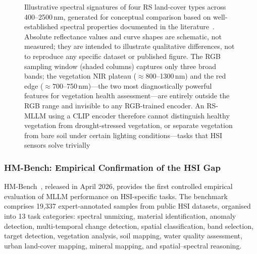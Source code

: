 \begin{figure}[h]
\caption{Illustrative spectral signatures of four RS land-cover types across
400--2500\,nm, generated for conceptual comparison based on
well-established spectral properties documented in the
literature~\cite{bioucas2013hyperspectral,yokoya2018hyperspectral,chen2014spectral}.
Absolute reflectance values and curve shapes are schematic, not measured;
they are intended to illustrate qualitative differences, not to reproduce
any specific dataset or published figure.
The RGB sampling window (shaded columns) captures only three broad bands;
the vegetation NIR plateau ($\approx\!800$--1300\,nm) and the red edge
($\approx\!700$--750\,nm)---the two most diagnostically powerful features for
vegetation health assessment---are entirely outside the RGB range and
invisible to any RGB-trained encoder. An RS-MLLM using a CLIP encoder
therefore cannot distinguish healthy vegetation from drought-stressed
vegetation, or separate vegetation from bare soil under certain lighting
conditions---tasks that HSI sensors solve trivially}\label{fig:hsi_sig}
\end{figure}

\subsubsection{HM-Bench: Empirical Confirmation of the HSI Gap}\label{sec5:hmbench}

HM-Bench~\cite{hmbench2026}, released in April 2026, provides the first
controlled empirical evaluation of MLLM performance on HSI-specific tasks.
The benchmark comprises 19,337 expert-annotated samples from public HSI
datasets, organised into 13 task categories: spectral unmixing, material
identification, anomaly detection, multi-temporal change detection, spatial
classification, band selection, target detection, vegetation analysis, soil
mapping, water quality assessment, urban land-cover mapping, mineral mapping,
and spatial--spectral reasoning.

